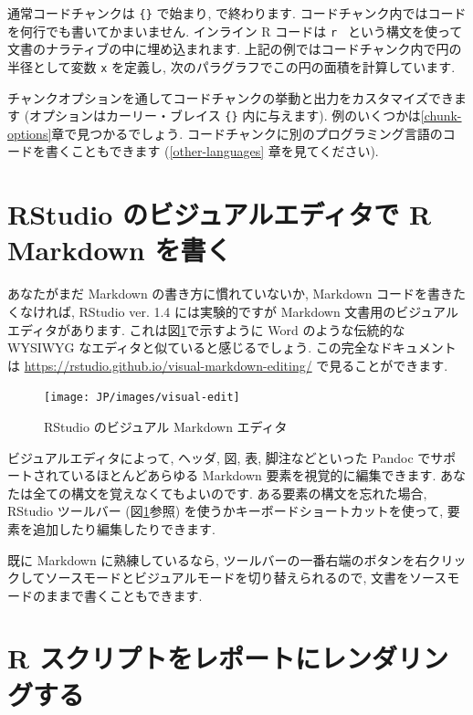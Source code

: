 \documentclass[
  11pt,
  lualatex,ja=standard,jafont=noto]{bxjsreport}
\begin{document}
通常コードチャンクは \texttt{\textasciigrave{}\textasciigrave{}\textasciigrave{}\{\}} で始まり, \texttt{\textasciigrave{}\textasciigrave{}\textasciigrave{}} で終わります. コードチャンク内ではコードを何行でも書いてかまいません. インライン R コードは \texttt{\textasciigrave{}r\ \textasciigrave{}} という構文を使って文書のナラティブの中に埋め込まれます. 上記の例ではコードチャンク内で円の半径として変数 \texttt{x} を定義し, 次のパラグラフでこの円の面積を計算しています.

チャンクオプションを通してコードチャンクの挙動と出力をカスタマイズできます (オプションはカーリー・ブレイス \texttt{\{\}} 内に与えます). 例のいくつかは\ref{chunk-options}章で見つかるでしょう. コードチャンクに別のプログラミング言語のコードを書くこともできます (\ref{other-languages} 章を見てください).

\hypertarget{rstudio-visual}{%
\section{RStudio のビジュアルエディタで R Markdown を書く}\label{rstudio-visual}}

あなたがまだ Markdown の書き方に慣れていないか, Markdown コードを書きたくなければ, RStudio ver. 1.4 には実験的ですが Markdown 文書用のビジュアルエディタがあります. これは図\ref{fig:visual-edit}で示すように Word のような伝統的な WYSIWYG なエディタと似ていると感じるでしょう. この完全なドキュメントは \url{https://rstudio.github.io/visual-markdown-editing/} で見ることができます.

\begin{figure}

{\centering \texttt{[image: JP/images/visual-edit]} 

}

\caption{RStudio のビジュアル Markdown エディタ}\label{fig:visual-edit}
\end{figure}

ビジュアルエディタによって, ヘッダ, 図, 表, 脚注などといった Pandoc でサポートされているほとんどあらゆる Markdown 要素を視覚的に編集できます. あなたは全ての構文を覚えなくてもよいのです. ある要素の構文を忘れた場合, RStudio ツールバー (図\ref{fig:visual-edit}参照) を使うかキーボードショートカットを使って, 要素を追加したり編集したりできます.

既に Markdown に熟練しているなら, ツールバーの一番右端のボタンを右クリックしてソースモードとビジュアルモードを切り替えられるので, 文書をソースモードのままで書くこともできます.

\hypertarget{spin}{%
\section{R スクリプトをレポートにレンダリングする}\label{spin}}
\end{document}
